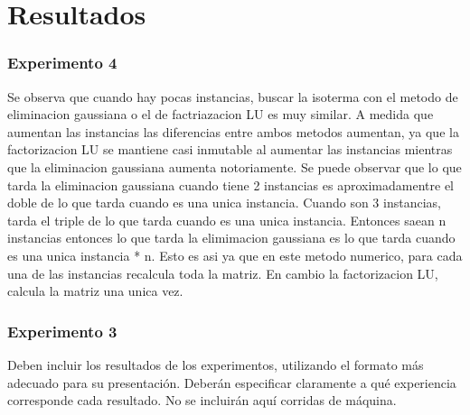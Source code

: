 \section{Resultados}
	
	\subsubsection*{Experimento 4}
	Se observa que cuando hay pocas instancias, buscar la isoterma con el metodo de eliminacion gaussiana o el de factriazacion LU es muy similar. A medida que aumentan las instancias las diferencias entre ambos metodos aumentan, ya que la factorizacion LU se mantiene casi inmutable al aumentar las instancias mientras que la eliminacion gaussiana aumenta notoriamente. Se puede observar que lo que tarda la eliminacion gaussiana cuando tiene 2 instancias es aproximadamentre el doble de lo que tarda cuando es una unica instancia. Cuando son 3 instancias, tarda el triple de lo que tarda cuando es una unica instancia. Entonces saean n instancias entonces lo que tarda la elimimacion gaussiana es lo que tarda cuando es una unica instancia * n. Esto es asi ya que en este metodo numerico, para cada una de las instancias recalcula toda la matriz. En cambio la factorizacion LU, calcula la matriz una unica vez.
  	
	\subsubsection*{Experimento 3}
	


  {\color{Gray} Deben incluir los resultados de los experimentos, utilizando el formato más adecuado para su presentación. Deberán especificar claramente a qué experiencia corresponde cada resultado. No se incluirán aquí corridas de máquina.}
